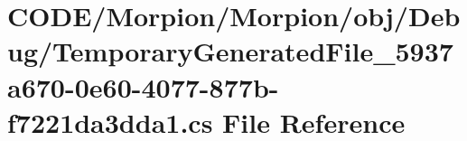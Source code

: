 \hypertarget{_morpion_2obj_2_debug_2_temporary_generated_file__5937a670-0e60-4077-877b-f7221da3dda1_8cs}{}\section{C\+O\+D\+E/\+Morpion/\+Morpion/obj/\+Debug/\+Temporary\+Generated\+File\+\_\+5937a670-\/0e60-\/4077-\/877b-\/f7221da3dda1.cs File Reference}
\label{_morpion_2obj_2_debug_2_temporary_generated_file__5937a670-0e60-4077-877b-f7221da3dda1_8cs}
